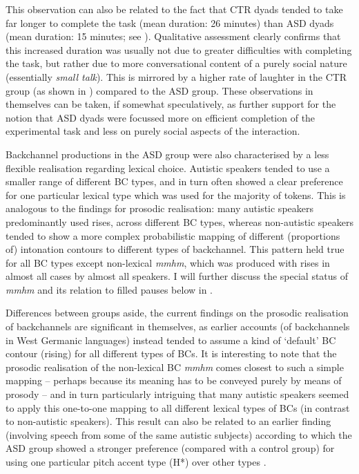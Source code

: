 This observation can also be related to the fact that CTR dyads tended to take far longer to complete the task (mean duration: 26 minutes) than ASD dyads (mean duration: 15 minutes; see ). Qualitative assessment clearly confirms that this increased duration was usually not due to greater difficulties with completing the task, but rather due to more conversational content of a purely social nature (essentially \textit{small talk}). This is mirrored by a higher rate of laughter in the CTR group (as shown in ) compared to the ASD group. These observations in themselves can be taken, if somewhat speculatively, as further support for the notion that ASD dyads were focussed more on efficient completion of the experimental task and less on purely social aspects of the interaction.

\largerpage
Backchannel productions in the ASD group were also characterised by a less flexible realisation regarding lexical choice. Autistic speakers tended to use a smaller range of different BC types, and in turn often showed a clear preference for one particular lexical type which was used for the majority of tokens. This is analogous to the findings for prosodic realisation: many autistic speakers predominantly used rises, across different BC types, whereas non-autistic speakers tended to show a more complex probabilistic mapping of different (proportions of) intonation contours to different types of backchannel. This pattern held true for all BC types except non-lexical \emph{mmhm}, which was produced with rises in almost all cases by almost all speakers. I will further discuss the special status of \emph{mmhm} and its relation to filled pauses below in .

Differences between groups aside, the current findings on the prosodic realisation of backchannels are significant in themselves, as earlier accounts (of backchannels in West Germanic languages) instead tended to assume a kind of ‘default’ BC contour (rising) for all different types of BCs. It is interesting to note that the prosodic realisation of the non-lexical BC \emph{mmhm} comes closest to such a simple mapping -- perhaps because its meaning has to be conveyed purely by means of prosody -- and in turn particularly intriguing that many autistic speakers seemed to apply this one-to-one mapping to all different lexical types of BCs (in contrast to non-autistic speakers). This result can also be related to an earlier finding (involving speech from some of the same autistic subjects) according to which the ASD group showed a stronger preference (compared with a control group) for using one particular pitch accent type (H*) over other types \citep{krugerProsodicMarkingInformation2018}.

